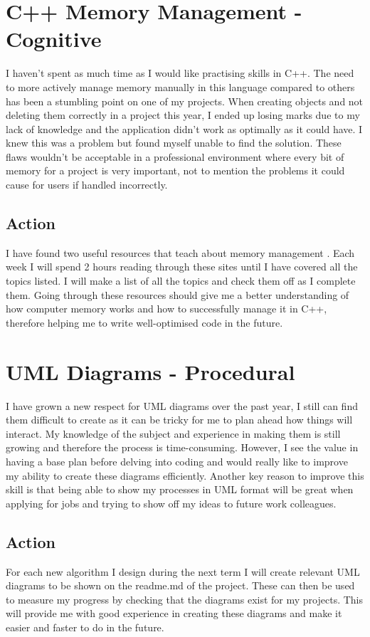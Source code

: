 \documentclass{scrartcl}
\begin{document}
\section{C++ Memory Management - Cognitive}
I haven't spent as much time as I would like practising skills in C++. The need to more actively manage memory manually in this language compared to others has been a stumbling point on one of my projects. When creating objects and not deleting them correctly in a project this year, I ended up losing marks due to my lack of knowledge and the application didn't work as optimally as it could have. I knew this was a problem but found myself unable to find the solution.
These flaws wouldn't be acceptable in a professional environment where every bit of memory for a project is very important, not to mention the problems it could cause for users if handled incorrectly. 
\subsection{Action}
I have found two useful resources that teach about memory management \cite{c++programming/memorymanagement} \cite{whateveryprogrammershouldknowaboutmemory}. Each week I will spend 2 hours reading through these sites until I have covered all the topics listed. I will make a list of all the topics and check them off as I complete them. Going through these resources should give me a better understanding of how computer memory works and how to successfully manage it in C++, therefore helping me to write well-optimised code in the future.

\section{UML Diagrams - Procedural}
I have grown a new respect for UML diagrams over the past year, I still can find them difficult to create as it can be tricky for me to plan ahead how things will interact. My knowledge of the subject and experience in making them is still growing and therefore the process is time-consuming. However, I see the value in having a base plan before delving into coding and would really like to improve my ability to create these diagrams efficiently. Another key reason to improve this skill is that being able to show my processes in UML format will be great when applying for jobs and trying to show off my ideas to future work colleagues.
\subsection{Action}
For each new algorithm I design during the next term I will create relevant UML diagrams to be shown on the readme.md of the project. These can then be used to measure my progress by checking that the diagrams exist for my projects. This will provide me with good experience in creating these diagrams and make it easier and faster to do in the future.
\end{document}

